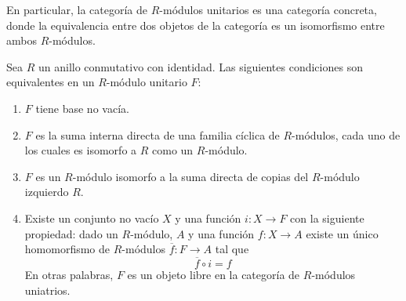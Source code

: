 \documentclass[12pt]{report}
\newcounter{it}
\theoremstyle{largebreak}
\newcommand\cf[3]{\ensuremath{#1:#2\rightarrow#3}}
\begin{document}
    En particular, la categoría de $R$-módulos unitarios es una categoría concreta, donde la equivalencia entre dos objetos de la categoría es un isomorfismo entre ambos $R$-módulos.

    \begin{theor}
        Sea $R$ un anillo conmutativo con identidad. Las siguientes condiciones son equivalentes en un $R$-módulo unitario $F$:
        \renewcommand{\theenumi}{\roman{enumi}}
        \begin{enumerate}
            \item $F$ tiene base no vacía.
            \item $F$ es la suma interna directa de una familia cíclica de $R$-módulos, cada uno de los cuales es isomorfo a $R$ como un $R$-módulo.
            \item $F$ es un $R$-módulo isomorfo a la suma directa de copias del $R$-módulo izquierdo $R$.
            \item Existe un conjunto no vacío $X$ y una función $\cf{i}{X}{F}$ con la siguiente propiedad: dado un $R$-módulo, $A$ y una función $\cf{f}{X}{A}$ existe un único homomorfismo de $R$-módulos $\cf{\overline{f}}{F}{A}$ tal que
            \begin{equation*}
                \overline{f}\circ i=f
            \end{equation*}
            En otras palabras, $F$ es un objeto libre en la categoría de $R$-módulos uniatrios.
        \end{enumerate}
    \end{theor}
\end{document}

